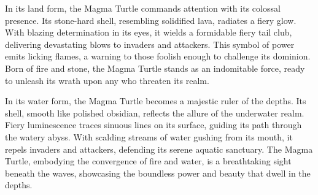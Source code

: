 In its land form, the Magma Turtle commands attention with its colossal presence. Its stone-hard shell, resembling solidified lava, radiates a fiery glow. With blazing determination in its eyes, it wields a formidable fiery tail club, delivering devastating blows to invaders and attackers. This symbol of power emits licking flames, a warning to those foolish enough to challenge its dominion. Born of fire and stone, the Magma Turtle stands as an indomitable force, ready to unleash its wrath upon any who threaten its realm.

In its water form, the Magma Turtle becomes a majestic ruler of the depths. Its shell, smooth like polished obsidian, reflects the allure of the underwater realm. Fiery luminescence traces sinuous lines on its surface, guiding its path through the watery abyss. With scalding streams of water gushing from its mouth, it repels invaders and attackers, defending its serene aquatic sanctuary. The Magma Turtle, embodying the convergence of fire and water, is a breathtaking sight beneath the waves, showcasing the boundless power and beauty that dwell in the depths.

\vfill\eject %


